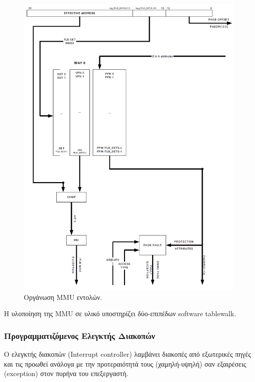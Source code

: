\documentclass[a4paper,10pt]{article}
\numberwithin{figure}{subsection}
\numberwithin{table}{subsection}
\begin{document}
{\newpage
\vspace{0.7cm}
\begin{figure}[h!]
 \centering
 \includegraphics[bb=0 0 891 1229,scale=0.38]{./Images/instruction_MMU.png}
 \caption{Οργάνωση MMU εντολών.}
\end{figure}
\vspace{0.7cm}

Η υλοποίηση της MMU σε υλικό υποστηρίζει δύο-επιπέδων software tablewalk.

\subsubsection{Προγραμματιζόμενος Ελεγκτής Διακοπών}

Ο ελεγκτής διακοπών (Interrupt controller) λαμβάνει διακοπές από εξωτερικές πηγές και τις
προωθεί ανάλογα με την προτεραιότητά τους (χαμηλή-υψηλή) σαν εξαιρέσεις (exception) στον
πυρήνα του επεξεργαστή.

}
\end{document}

